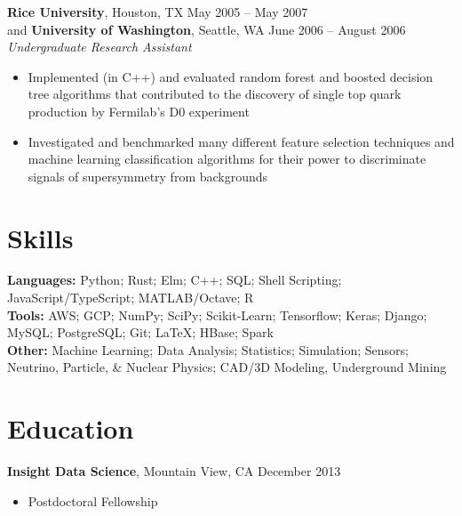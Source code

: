 \documentclass[margin,line]{resume}
\begin{document}
\begin{resume}
    \textbf{Rice University}, Houston, TX \hfill May 2005 -- May 2007 \vspace{1mm}\\\vspace{1mm}%
    and \textbf{University of Washington}, Seattle, WA \hfill June 2006 -- August 2006 \vspace{1mm}\\\vspace{1mm}%
    \textsl{Undergraduate Research Assistant}
    \begin{itemize}
    \item Implemented (in C++) and evaluated random forest and boosted decision tree algorithms that contributed to the discovery of single top quark production by Fermilab's D0 experiment%
    \item Investigated and benchmarked many different feature selection techniques and machine learning classification algorithms for their power to discriminate signals of supersymmetry from backgrounds
    \end{itemize}
    
    \section{\mysidestyle Skills}%
    \textbf{Languages:} Python; Rust; Elm; C++; SQL; Shell Scripting; JavaScript/TypeScript; MATLAB/Octave; R
    \vspace{1mm}\\%
    \textbf{Tools:} AWS; GCP; NumPy; SciPy; Scikit-Learn; Tensorflow; Keras; Django; MySQL; PostgreSQL; Git; \LaTeX; HBase; Spark
    \vspace{1mm}\\%
    \textbf{Other:} Machine Learning; Data Analysis; Statistics; Simulation; Sensors; Neutrino, Particle, \& Nuclear Physics; CAD/3D Modeling, Underground Mining %


    \section{\mysidestyle Education}
    \textbf{Insight Data Science}, Mountain View, CA \hfill December 2013\vspace{-3mm}\\%
    \begin{itemize}
    \item Postdoctoral Fellowship
    \end{itemize}\vspace{-1.5mm}


\end{resume}
\end{document}

